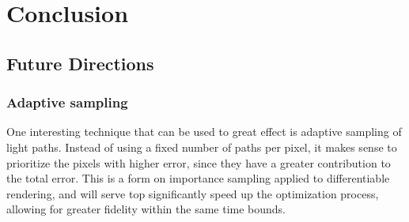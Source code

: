 \chapter{Conclusion}
\label{chapter-conclusion}

\section{Future Directions}
\subsection{Adaptive sampling}
One interesting technique that can be used to great effect is adaptive sampling of light paths. Instead of using a fixed number of paths per pixel, it makes sense to prioritize the pixels with higher error, since they have a greater contribution to the total error. This is a form on importance sampling applied to differentiable rendering, and will serve top significantly speed up the optimization process, allowing for greater fidelity within the same time bounds.